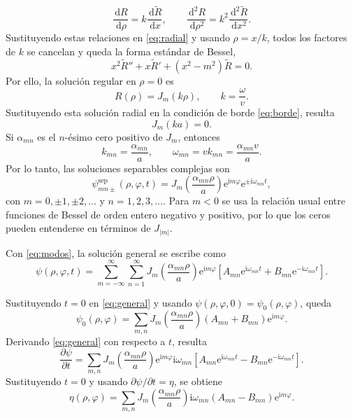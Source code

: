 \documentclass[11pt]{article}
\newcommand{\dd}{\,\mathrm{d}}
\newcommand{\ii}{\mathrm{i}}
\newcommand{\e}{\mathrm{e}}
\begin{document}
\[
\frac{\dd R}{\dd \rho}=k\frac{\dd \widetilde R}{\dd x},
\qquad
\frac{\dd^2 R}{\dd \rho^2}=k^2\frac{\dd^2 \widetilde R}{\dd x^2}.
\]
Sustituyendo estas relaciones en \eqref{eq:radial} y usando $\rho=x/k$, todos los factores de $k$ se cancelan y queda la forma estándar de Bessel,
\[
x^2\widetilde R''+x\widetilde R'+(x^2-m^2)\widetilde R=0.
\]
Por ello, la solución regular en $\rho=0$ es
\[
R(\rho)=J_{m}(k\rho),
\qquad k=\frac{\omega}{v}.
\]
Sustituyendo esta solución radial en la condición de borde \eqref{eq:borde}, resulta
\[
J_{m}(ka)=0.
\]
Si $\alpha_{mn}$ es el $n$-ésimo cero positivo de $J_m$, entonces
\begin{equation}
k_{mn}=\frac{\alpha_{mn}}{a},
\qquad
\omega_{mn}=vk_{mn}=\frac{\alpha_{mn}v}{a}.
\label{eq:frecuencia}
\end{equation}
Por lo tanto, las soluciones separables complejas son
\begin{equation}
\psi^{\mathrm{sep}}_{mn\pm}(\rho,\varphi,t)
=J_{m}\left(\frac{\alpha_{mn}\rho}{a}\right)\e^{\ii m\varphi}\e^{\pm\ii\omega_{mn}t},
\label{eq:modos}
\end{equation}
con $m=0,\pm1,\pm2,\ldots$ y $n=1,2,3,\ldots$. Para $m<0$ se usa la relación usual entre funciones de Bessel de orden entero negativo y positivo, por lo que los ceros pueden entenderse en términos de $J_{|m|}$.

Con \eqref{eq:modos}, la solución general se escribe como
\begin{equation}
\psi(\rho,\varphi,t)
=\sum_{m=-\infty}^{\infty}\sum_{n=1}^{\infty}
J_{m}\left(\frac{\alpha_{mn}\rho}{a}\right)\e^{\ii m\varphi}
\left[A_{mn}\e^{\ii\omega_{mn}t}+B_{mn}\e^{-\ii\omega_{mn}t}\right].
\label{eq:general}
\end{equation}

Sustituyendo $t=0$ en \eqref{eq:general} y usando $\psi(\rho,\varphi,0)=\psi_0(\rho,\varphi)$, queda
\begin{equation}
\psi_0(\rho,\varphi)
=\sum_{m,n}J_{m}\left(\frac{\alpha_{mn}\rho}{a}\right)(A_{mn}+B_{mn})\e^{\ii m\varphi}.
\label{eq:posicion}
\end{equation}
Derivando \eqref{eq:general} con respecto a $t$, resulta
\[
\frac{\partial\psi}{\partial t}
=\sum_{m,n}J_{m}\left(\frac{\alpha_{mn}\rho}{a}\right)\e^{\ii m\varphi}
\ii\omega_{mn}\left[A_{mn}\e^{\ii\omega_{mn}t}-B_{mn}\e^{-\ii\omega_{mn}t}\right].
\]
Sustituyendo $t=0$ y usando $\partial\psi/\partial t=\eta$, se obtiene
\begin{equation}
\eta(\rho,\varphi)
=\sum_{m,n}J_{m}\left(\frac{\alpha_{mn}\rho}{a}\right)
\ii\omega_{mn}(A_{mn}-B_{mn})\e^{\ii m\varphi}.
\label{eq:velocidad}
\end{equation}
\end{document}
